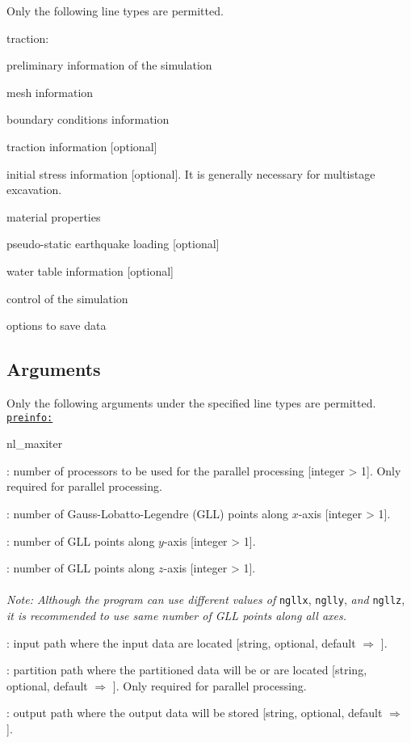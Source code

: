 Only the following line types are permitted.
\begin{adescription}{traction:}
\item[preinfo:]  preliminary information of the simulation
\item[mesh:]     mesh information
\item[bc:]      boundary conditions information
\item[traction:] traction information [optional]
\item[stress0:] initial stress information [optional]. It is generally necessary for multistage excavation.
\item[material:] material properties
\item[eqload:]   pseudo-static earthquake loading [optional]
\item[water:]    water table information [optional]
\item[control:]  control of the simulation
\item[save:]  options to save data
\end{adescription}

\subsection{Arguments}

Only the following arguments under the specified line types are permitted.\\

\texttt{\underline{preinfo:}}

\begin{adescription}{nl\_maxiter}
  \item[nproc] : number of processors to be used for the parallel processing [integer > 1]. Only required for parallel processing.
  \item[ngllx] : number of Gauss-Lobatto-Legendre (GLL) points along $x$-axis [integer > 1].
  \item[nglly] : number of GLL points along $y$-axis [integer > 1].
  \item[ngllz] : number of GLL points along $z$-axis [integer > 1]. \\\\
  {\emph{Note: Although the program can use different values of}} \texttt{ngllx}, \texttt{nglly}, {\emph{and}} \texttt{ngllz}, {\emph{it is recommended to use same number of GLL points along all axes.}}
  \item[inp\_path]  : input path where the input data are located [string, optional, default $\Rightarrow$ \texttt{}].
  \item[part\_path] : partition path where the partitioned data will be or are located [string, optional, default $\Rightarrow$ \texttt{}]. Only required for parallel processing.
  \item[out\_path]  : output path where the output data will be stored [string, optional, default $\Rightarrow$ \texttt{}].\\
\end{adescription}


